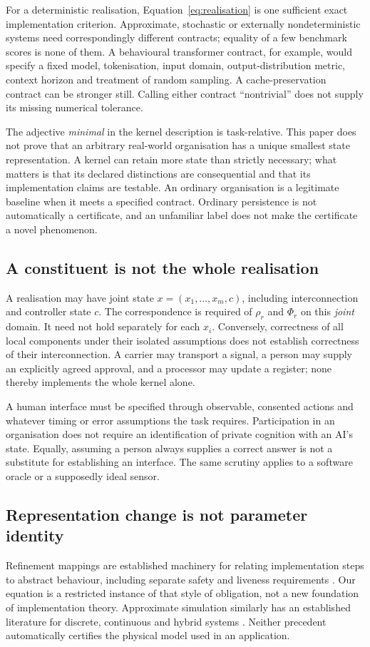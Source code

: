 \documentclass[11pt,a4paper]{article}
\theoremstyle{definition}
\theoremstyle{remark}
\begin{document}
For a deterministic realisation, Equation~\eqref{eq:realisation} is one sufficient exact implementation criterion. Approximate, stochastic or externally nondeterministic systems need correspondingly different contracts; equality of a few benchmark scores is none of them. A behavioural transformer contract, for example, would specify a fixed model, tokenisation, input domain, output-distribution metric, context horizon and treatment of random sampling. A cache-preservation contract can be stronger still. Calling either contract ``nontrivial'' does not supply its missing numerical tolerance.

The adjective \emph{minimal} in the kernel description is task-relative. This paper does not prove that an arbitrary real-world organisation has a unique smallest state representation. A kernel can retain more state than strictly necessary; what matters is that its declared distinctions are consequential and that its implementation claims are testable. An ordinary organisation is a legitimate baseline when it meets a specified contract. Ordinary persistence is not automatically a certificate, and an unfamiliar label does not make the certificate a novel phenomenon.

\subsection{A constituent is not the whole realisation}
A realisation may have joint state $x=(x_1,\ldots,x_m,c)$, including interconnection and controller state $c$. The correspondence is required of $\rho_r$ and $\Phi_r$ on this \emph{joint} domain. It need not hold separately for each $x_i$. Conversely, correctness of all local components under their isolated assumptions does not establish correctness of their interconnection. A carrier may transport a signal, a person may supply an explicitly agreed approval, and a processor may update a register; none thereby implements the whole kernel alone.

A human interface must be specified through observable, consented actions and whatever timing or error assumptions the task requires. Participation in an organisation does not require an identification of private cognition with an AI's state. Equally, assuming a person always supplies a correct answer is not a substitute for establishing an interface. The same scrutiny applies to a software oracle or a supposedly ideal sensor.

\subsection{Representation change is not parameter identity}\label{subsec:representationchange}
Refinement mappings are established machinery for relating implementation steps to abstract behaviour, including separate safety and liveness requirements \citep{abadi}. Our equation is a restricted instance of that style of obligation, not a new foundation of implementation theory. Approximate simulation similarly has an established literature for discrete, continuous and hybrid systems \citep{girard}. Neither precedent automatically certifies the physical model used in an application.
\end{document}
